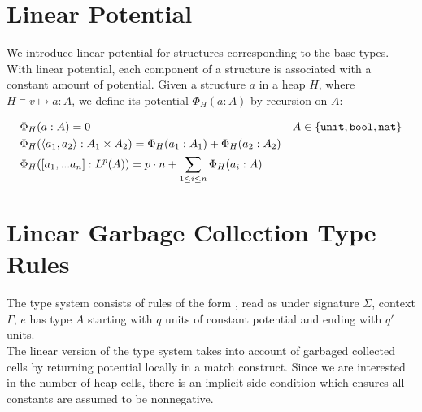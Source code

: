 \documentclass[11pt]{article}
\newcommand{\irl}[1]{\mathtt{#1}}
\newcounter{rule}
\newcommand{\inferr}[2]{\inferrule{#2}{#1}}
\newcommand{\stack}[1]{\irl{stack}(#1)}
\theoremstyle{definition}
\begin{document}
\iffalse
\section{Stack vs Heap Allocated Types}
In order to share variables, we need to distinguish between types that are allocated on the stack and the heap. 
We write \fbox{$\stack{A}$} to denote that values of type $A$ will be allocataed \emph{entirely} on the stack at run time (no references into the heap). 

\begin{mathpar}
\inferr{
  \stack{A}
}
{
  A \in \{\unittyabt,\booltyabt,\irl{nat}\}
}(\text{S:Const})

\inferr{
  \stack{\prodtycst{A_1}{A_2}}
}
{
  \stack{A_1} \\
  \stack{A_2}
}(\text{S:Product})
\end{mathpar}
\fi

\section{Linear Potential}\label{sec:potential}
We introduce linear potential for structures corresponding to the base types.
With linear potential, each component of a structure is associated with a constant amount of potential. 
Given a structure $a$ in a heap $H$, where  $H \vDash v \mapsto a : A$, we define its potential 
$\Phi_H(a : A)$ by recursion on $A$: 

\begin{align*}
&\Phi_H(a : A) = 0 &A \in \{\unittycst, \booltyabt, \irl{nat}\}\\
&\Phi_H(\pairexcst{a_1}{a_2} : \prodtycst{A_1}{A_2}) = \Phi_H(a_1 : A_1) + \Phi_H(a_2 : A_2)\\
&\Phi_H([a_1,...a_n] : L^p(A)) = p\cdot n + \sum_{1 \le i \le n} \Phi_H(a_i : A)  
\end{align*}

\section{Linear Garbage Collection Type Rules}
\label{sec:typing}
The type system \fogc consists of rules of the form , read as 
under signature $\Sigma$, context $\Gamma$, $e$ has type $A$ starting with $q$ units of constant potential and 
ending with $q'$ units.\\

The linear version of the type system takes into account of garbaged collected cells by returning potential locally in a match construct. Since we are interested in the number of heap cells, 
there is an implicit side condition which ensures all constants are assumed to be nonnegative.\\
\end{document}
